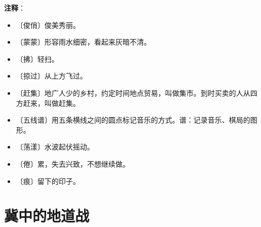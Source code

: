 \documentclass[12pt,UTF-8,openany]{ctexbook}
\begin{document}
\newpage

\textbf{注释}：

\vspace{-1em}

\begin{itemize}
    \setlength\itemsep{-0.2em}
    \item 〔俊俏〕俊美秀丽。
    \item 〔蒙蒙〕形容雨水细密，看起来灰暗不清。
    \item 〔拂〕轻扫。
    \item 〔掠过〕从上方飞过。
    \item 〔赶集〕地广人少的乡村，约定时间地点贸易，叫做集市。到时买卖的人从四方赶来，叫做赶集。
    \item 〔五线谱〕用五条横线之间的圆点标记音乐的方式。谱：记录音乐、棋局的图形。
    \item 〔荡漾〕水波起伏摇动。
    \item 〔倦〕累，失去兴致，不想继续做。
    \item 〔痕〕留下的印子。
\end{itemize}

\chapter{冀中的地道战}
\end{document}
